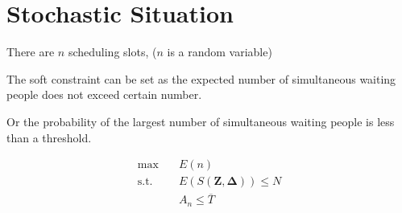 \documentclass{article}
\newcommand{\Z}{\mathbf{Z}}
\newcommand{\D}{\bm{\Delta}}
\begin{document}
\section{Stochastic Situation}
There are $n$ scheduling slots, ($n$ is a random variable)

The soft constraint can be set as the expected number of simultaneous waiting people does not exceed certain number. 

Or the probability of the largest number of simultaneous waiting people is less than a threshold.

\begin{equation}\label{stochastic_model}
    \begin{aligned}
        \max \quad & E(n) \\
        \mbox{s.t.} \quad & E(S(\Z, \D)) \leq N \\
        & A_{n} \leq \overline{T}
    \end{aligned}
\end{equation}
\end{document}
